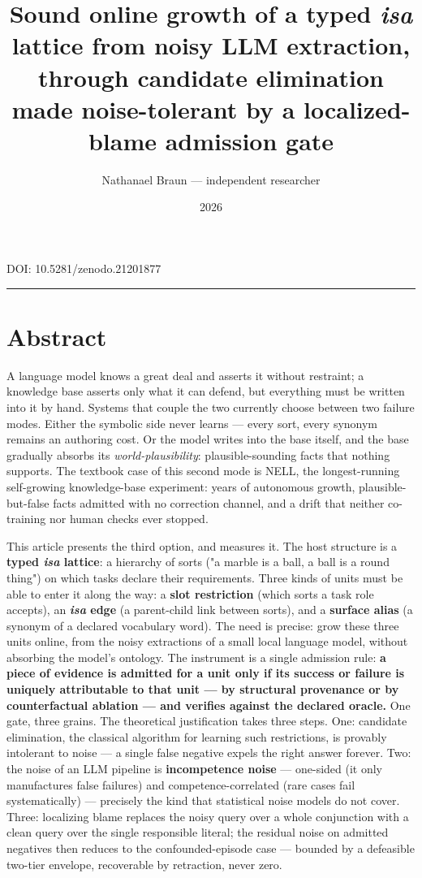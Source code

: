 \documentclass[11pt]{article}
\title{\textbf{Sound online growth of a typed \emph{isa} lattice from noisy LLM extraction, through candidate elimination made noise-tolerant by a localized-blame admission gate}}
\author{Nathanael Braun — independent researcher}
\date{2026}
\begin{document}
\maketitle
DOI: 10.5281/zenodo.21201877

\medskip\hrule\medskip

\section*{Abstract}

A language model knows a great deal and asserts it without restraint; a knowledge base asserts only what it can defend, but everything must be written into it by hand. Systems that couple the two currently choose between two failure modes. Either the symbolic side never learns — every sort, every synonym remains an authoring cost. Or the model writes into the base itself, and the base gradually absorbs its \emph{world-plausibility}: plausible-sounding facts that nothing supports. The textbook case of this second mode is NELL, the longest-running self-growing knowledge-base experiment: years of autonomous growth, plausible-but-false facts admitted with no correction channel, and a drift that neither co-training nor human checks ever stopped.

This article presents the third option, and measures it. The host structure is a \textbf{typed \emph{isa} lattice}: a hierarchy of sorts ("a marble is a ball, a ball is a round thing") on which tasks declare their requirements. Three kinds of units must be able to enter it along the way: a \textbf{slot restriction} (which sorts a task role accepts), an \textbf{\emph{isa} edge} (a parent-child link between sorts), and a \textbf{surface alias} (a synonym of a declared vocabulary word). The need is precise: grow these three units online, from the noisy extractions of a small local language model, without absorbing the model's ontology. The instrument is a single admission rule: \textbf{a piece of evidence is admitted for a unit only if its success or failure is uniquely attributable to that unit — by structural provenance or by counterfactual ablation — and verifies against the declared oracle.} One gate, three grains. The theoretical justification takes three steps. One: candidate elimination, the classical algorithm for learning such restrictions, is provably intolerant to noise — a single false negative expels the right answer forever. Two: the noise of an LLM pipeline is \textbf{incompetence noise} — one-sided (it only manufactures false failures) and competence-correlated (rare cases fail systematically) — precisely the kind that statistical noise models do not cover. Three: localizing blame replaces the noisy query over a whole conjunction with a clean query over the single responsible literal; the residual noise on admitted negatives then reduces to the confounded-episode case — bounded by a defeasible two-tier envelope, recoverable by retraction, never zero.
\end{document}

